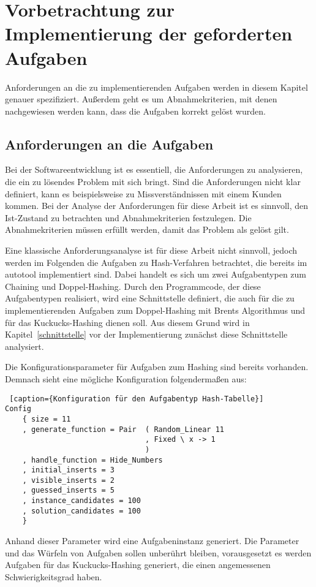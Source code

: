 \chapter{Vorbetrachtung zur Implementierung der geforderten Aufgaben}\label{implement}
Anforderungen an die zu implementierenden Aufgaben werden in diesem Kapitel genauer spezifiziert. Außerdem geht es um Abnahmekriterien, mit denen nachgewiesen werden kann, dass die Aufgaben korrekt gelöst wurden.

\section{Anforderungen an die Aufgaben}\label{anforderungen}
Bei der Softwareentwicklung ist es essentiell, die Anforderungen zu analysieren, die ein zu lösendes Problem mit sich bringt. Sind die Anforderungen nicht klar definiert, kann es beispielsweise zu Missverständnissen mit einem Kunden kommen. Bei der Analyse der Anforderungen für diese Arbeit ist es sinnvoll, den Ist-Zustand zu betrachten und Abnahmekriterien festzulegen. Die Abnahmekriterien müssen erfüllt werden, damit das Problem als gelöst gilt. 

Eine klassische Anforderungsanalyse ist für diese Arbeit nicht sinnvoll, jedoch werden im Folgenden die Aufgaben zu Hash-Verfahren betrachtet, die bereits im autotool implementiert sind. Dabei handelt es sich um zwei Aufgabentypen zum  Chaining und Doppel-Hashing. Durch den Programmcode, der diese Aufgabentypen realisiert, wird eine Schnittstelle definiert, die auch für die zu implementierenden Aufgaben zum Doppel-Hashing mit Brents Algorithmus und für das Kuckucks-Hashing dienen soll. Aus diesem Grund wird in Kapitel~\ref{schnittstelle} vor der Implementierung zunächst diese Schnittstelle analysiert. 

Die Konfigurationsparameter für Aufgaben zum Hashing sind bereits vorhanden. Demnach sieht eine mögliche Konfiguration folgendermaßen aus:
\begin{lstlisting} [caption={Konfiguration für den Aufgabentyp Hash-Tabelle}]
Config
	{ size = 11
	, generate_function = Pair  ( Random_Linear 11
                                , Fixed \ x -> 1
                                )
	, handle_function = Hide_Numbers
	, initial_inserts = 3
	, visible_inserts = 2
	, guessed_inserts = 5
	, instance_candidates = 100
	, solution_candidates = 100 
	}
\end{lstlisting}
Anhand dieser Parameter wird eine Aufgabeninstanz generiert. Die Parameter und das Würfeln von Aufgaben sollen unberührt bleiben, vorausgesetzt es werden Aufgaben für das Kuckucks-Hashing generiert, die einen angemessenen Schwierigkeitsgrad haben.  

